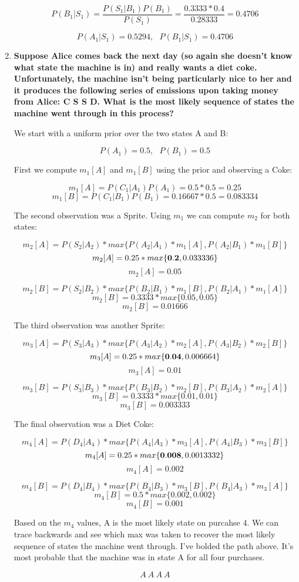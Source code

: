 \documentclass[fleqn]{hermans-hw}
\begin{document}
\begin{enumerate}
  $$P(B_1 | S_1) = \frac{P(S_1 | B_1) P(B_1)}{P(S_1)} = \frac{0.3333 * 0.4}{0.28333} = 0.4706$$
  
  $$\boxed{P(A_1 | S_1) = 0.5294, \ \ \ P(B_1 | S_1) = 0.4706}$$

\item {\bf Suppose Alice comes back the next day (so again she doesn't know
  what state the machine is in) and really wants a diet coke.
  Unfortunately, the machine isn't being particularly nice to her and
  it produces the following series of emissions upon taking money from
  Alice: C S S D.  What is the most likely sequence of states the
  machine went through in this process?}
  
  We start with a uniform prior over the two states A and B:
  
  $$P(A_1) = 0.5, \ \ \ P(B_1) = 0.5$$
  
  First we compute $m_1[A]$ and $m_1[B]$ using the prior and observing a Coke:
  
  $$m_1[A] = P(C_1 | A_1)P(A_1) = 0.5 * 0.5 = 0.25$$
  $$m_1[B] = P(C_1 | B_1)P(B_1) = 0.16667 * 0.5 = 0.083334$$
  
  The second observation was a Sprite. Using $m_1$ we can compute $m_2$ for both states:
  
  $$m_2[A] = P(S_2 | A_2) * max\{P(A_2 | A_1) * m_1[A], P(A_2 | B_1) * m_1[B]\}$$
  $$m_2[A] = 0.25 * max\{{\bf 0.2}, 0.033336\}$$
  $$m_2[A] = 0.05$$
  
  $$m_2[B] = P(S_2 | B_2) * max\{P(B_2 | B_1) * m_1[B], P(B_2 | A_1) * m_1[A]\}$$
  $$m_2[B] = 0.3333 * max\{0.05, 0.05\}$$
  $$m_2[B] = 0.01666$$
  
  The third observation was another Sprite:
  
  $$m_3[A] = P(S_3 | A_3) * max\{P(A_3 | A_2) * m_2[A], P(A_3 | B_2) * m_2[B]\}$$
  $$m_3[A] = 0.25 * max\{{\bf 0.04}, 0.006664\}$$
  $$m_3[A] = 0.01$$
  
  $$m_3[B] = P(S_3 | B_3) * max\{P(B_3 | B_2) * m_2[B], P(B_3 | A_2) * m_2[A]\}$$
  $$m_3[B] = 0.3333 * max\{0.01, 0.01\}$$
  $$m_3[B] = 0.003333$$
  
  The final observation was a Diet Coke:
  
  $$m_4[A] = P(D_4 | A_4) * max\{P(A_4 | A_3) * m_3[A], P(A_4 | B_3) * m_3[B]\}$$
  $$m_4[A] = 0.25 * max\{{\bf 0.008}, 0.0013332\}$$
  $$m_4[A] = 0.002$$
  
  $$m_4[B] = P(D_4 | B_4) * max\{P(B_4 | B_3) * m_3[B], P(B_4 | A_3) * m_3[A]\}$$
  $$m_4[B] = 0.5 * max\{0.002, 0.002\}$$
  $$m_4[B] = 0.001$$
  
  Based on the $m_4$ values, A is the most likely state on purcahse 4. We can trace backwards and see which max was taken to recover the most likely sequence of states the machine went through. I've bolded the path above. It's most probable that the machine was in state A for all four purchases.
  
  $$\boxed{A \ A \ A \ A}$$
\end{enumerate}
\end{document}
